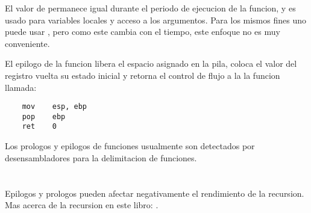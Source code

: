 El valor de \EBP permanece igual durante el periodo de ejecucion de la funcion, y es usado para variables locales y acceso a los argumentos.
Para los mismos fines uno puede usar \ESP, pero como este cambia con el tiempo, este enfoque no es muy conveniente.

El epilogo de la funcion libera el espacio asignado en la pila, coloca el valor del registro \EBP vuelta su estado inicial y retorna el control de flujo a la la funcion llamada:

\begin{lstlisting}
    mov    esp, ebp
    pop    ebp
    ret    0
\end{lstlisting}

Los prologos y epilogos de funciones usualmente son detectados por desensambladores para la delimitacion de funciones.

\ifx\LITE\undefined
\section{\Recursion}
\index{\Recursion}

Epilogos y prologos pueden afectar negativamente el rendimiento de la recursion.
Mas acerca de la recursion en este libro: .

\fi %
\fi %

